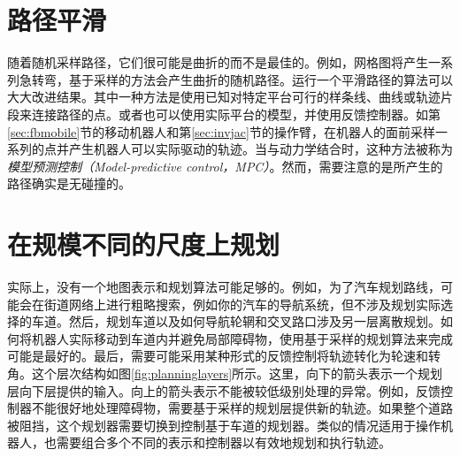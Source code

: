 \section{路径平滑}
随着随机采样路径，它们很可能是曲折的而不是最佳的。例如，网格图将产生一系列急转弯，基于采样的方法会产生曲折的随机路径。运行一个平滑路径的算法可以大大改进结果。其中一种方法是使用已知对特定平台可行的样条线、曲线或轨迹片段来连接路径的点。或者也可以使用实际平台的模型，并使用反馈控制器。如第\ref{sec:fbmobile}节的移动机器人和第\ref{sec:invjac}节的操作臂，在机器人的面前采样一系列的点并产生机器人可以实际驱动的轨迹。当与动力学结合时，这种方法被称为\emph{模型预测控制（Model-predictive control，MPC）}。然而，需要注意的是所产生的路径确实是无碰撞的。



\section{在规模不同的尺度上规划}
实际上，没有一个地图表示和规划算法可能足够的。例如，为了汽车规划路线，可能会在街道网络上进行粗略搜索，例如你的汽车的导航系统，但不涉及规划实际选择的车道。然后，规划车道以及如何导航轮辋和交叉路口涉及另一层离散规划。如何将机器人实际移动到车道内并避免局部障碍物，使用基于采样的规划算法来完成可能是最好的。最后，需要可能采用某种形式的反馈控制将轨迹转化为轮速和转角。这个层次结构如图\ref{fig:planninglayers}所示。这里，向下的箭头表示一个规划层向下层提供的输入。向上的箭头表示不能被较低级别处理的异常。例如，反馈控制器不能很好地处理障碍物，需要基于采样的规划层提供新的轨迹。如果整个道路被阻挡，这个规划器需要切换到控制基于车道的规划器。类似的情况适用于操作机器人，也需要组合多个不同的表示和控制器以有效地规划和执行轨迹。

